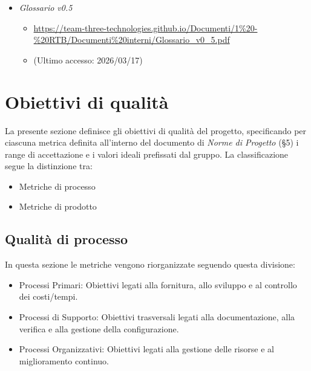 \documentclass[a4paper,12pt]{article}
\begin{document}
{\begin{itemize}
\begin{itemize}
                        \item \url{https://www.math.unipd.it/~tullio/IS-1/2009/Approfondimenti/ISO_12207-1995.pdf}
                        \item[] (Ultimo accesso: 2026/02/03)
                    \end{itemize}
                    \item \textit{Glossario v0.5}
                    \begin{itemize}
                        \item \url{https://team-three-technologies.github.io/Documenti/1%20-%20RTB/Documenti%20interni/Glossario_v0_5.pdf}
                        \item[] (Ultimo accesso: 2026/03/17)
                    \end{itemize}
                \end{itemize}
    }

    \newpage

    \section{Obiettivi di qualità}
    La presente sezione definisce gli obiettivi di qualità del progetto, specificando per ciascuna metrica definita all'interno del documento di \textit{Norme di Progetto} (\S5) i range di accettazione e i valori ideali prefissati dal gruppo. La classificazione segue la distinzione tra:
    \begin{itemize}
        \item Metriche di processo
        \item Metriche di prodotto
    \end{itemize}
    
        \subsection{Qualità di processo}
            In questa sezione le metriche vengono riorganizzate seguendo questa divisione: 
            \begin{itemize}
                \item Processi Primari: Obiettivi legati alla fornitura, allo sviluppo e al controllo dei costi/tempi.
                \item Processi di Supporto: Obiettivi trasversali legati alla documentazione, alla verifica e alla gestione della configurazione.
                \item Processi Organizzativi: Obiettivi legati alla gestione delle risorse e al miglioramento continuo.
            \end{itemize}
            
\end{document}
